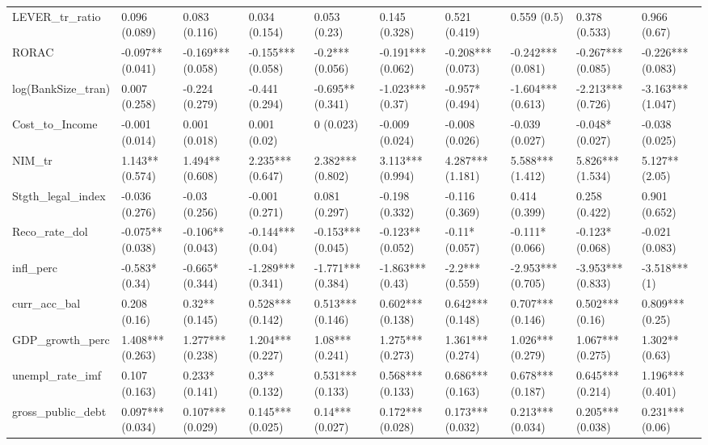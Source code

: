 \begin{table}[H]
\begin{adjustbox}{totalheight=3in, width=\columnwidth }
\begin{subtable}[c]{1.1\textwidth}
{\begin{tabular}{llllllllll}
  LEVER\_tr\_ratio & 0.096 (0.089) & 0.083 (0.116) & 0.034 (0.154) & 0.053 (0.23) & 0.145 (0.328) & 0.521 (0.419) & 0.559 (0.5) & 0.378 (0.533) & 0.966 (0.67) \\ 
  RORAC & -0.097** (0.041) & -0.169*** (0.058) & -0.155*** (0.058) & -0.2*** (0.056) & -0.191*** (0.062) & -0.208*** (0.073) & -0.242*** (0.081) & -0.267*** (0.085) & -0.226*** (0.083) \\ 
  log(BankSize\_tran) & 0.007 (0.258) & -0.224 (0.279) & -0.441 (0.294) & -0.695** (0.341) & -1.023*** (0.37) & -0.957* (0.494) & -1.604*** (0.613) & -2.213*** (0.726) & -3.163*** (1.047) \\ 
  Cost\_to\_Income & -0.001 (0.014) & 0.001 (0.018) & 0.001 (0.02) & 0 (0.023) & -0.009 (0.024) & -0.008 (0.026) & -0.039 (0.027) & -0.048* (0.027) & -0.038 (0.025) \\ 
  NIM\_tr & 1.143** (0.574) & 1.494** (0.608) & 2.235*** (0.647) & 2.382*** (0.802) & 3.113*** (0.994) & 4.287*** (1.181) & 5.588*** (1.412) & 5.826*** (1.534) & 5.127** (2.05) \\ 
  Stgth\_legal\_index & -0.036 (0.276) & -0.03 (0.256) & -0.001 (0.271) & 0.081 (0.297) & -0.198 (0.332) & -0.116 (0.369) & 0.414 (0.399) & 0.258 (0.422) & 0.901 (0.652) \\ 
  Reco\_rate\_dol & -0.075** (0.038) & -0.106** (0.043) & -0.144*** (0.04) & -0.153*** (0.045) & -0.123** (0.052) & -0.11* (0.057) & -0.111* (0.066) & -0.123* (0.068) & -0.021 (0.083) \\ 
  infl\_perc & -0.583* (0.34) & -0.665* (0.344) & -1.289*** (0.341) & -1.771*** (0.384) & -1.863*** (0.43) & -2.2*** (0.559) & -2.953*** (0.705) & -3.953*** (0.833) & -3.518*** (1) \\ 
  curr\_acc\_bal & 0.208 (0.16) & 0.32** (0.145) & 0.528*** (0.142) & 0.513*** (0.146) & 0.602*** (0.138) & 0.642*** (0.148) & 0.707*** (0.146) & 0.502*** (0.16) & 0.809*** (0.25) \\ 
  GDP\_growth\_perc & 1.408*** (0.263) & 1.277*** (0.238) & 1.204*** (0.227) & 1.08*** (0.241) & 1.275*** (0.273) & 1.361*** (0.274) & 1.026*** (0.279) & 1.067*** (0.275) & 1.302** (0.63) \\ 
  unempl\_rate\_imf & 0.107 (0.163) & 0.233* (0.141) & 0.3** (0.132) & 0.531*** (0.133) & 0.568*** (0.133) & 0.686*** (0.163) & 0.678*** (0.187) & 0.645*** (0.214) & 1.196*** (0.401) \\ 
  gross\_public\_debt & 0.097*** (0.034) & 0.107*** (0.029) & 0.145*** (0.025) & 0.14*** (0.027) & 0.172*** (0.028) & 0.173*** (0.032) & 0.213*** (0.034) & 0.205*** (0.038) & 0.231*** (0.06) \\ 

\end{tabular}}
\end{subtable}
\end{adjustbox}
\end{table}
